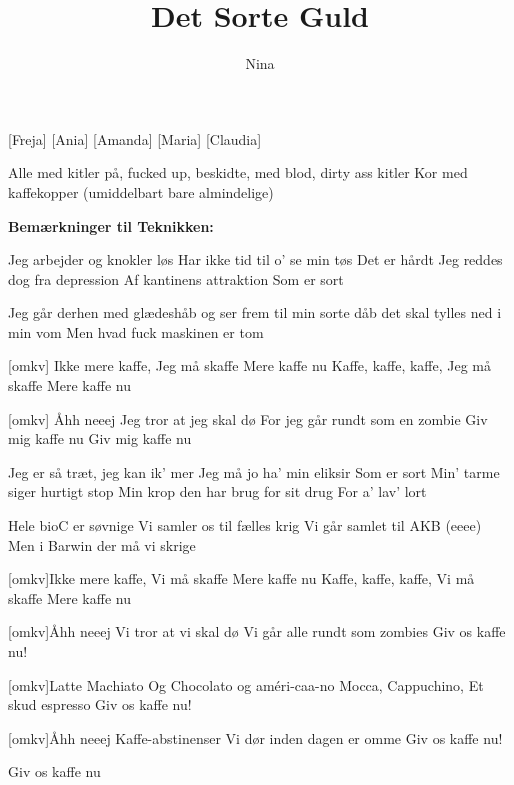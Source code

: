 \documentclass[a4paper,11pt]{article}
\title{Det Sorte Guld}
\author{Nina}
\begin{document}
\maketitle

\begin{roles}
    [Freja]
[Ania]
[Amanda]
[Maria]
[Claudia]
\end{roles}

\begin{props}
     Alle med kitler på, fucked up, beskidte, med blod, dirty ass kitler
    Kor med kaffekopper (umiddelbart bare almindelige)
\end{props}

\textbf{Bemærkninger til Teknikken:} %


\begin{song}
   Jeg arbejder og knokler løs
Har ikke tid til o’ se min tøs
Det er hårdt
Jeg reddes dog fra depression
Af kantinens attraktion
Som er sort
 
Jeg går derhen med glædeshåb
og ser frem til min sorte dåb
det skal tylles ned i min vom
Men hvad fuck maskinen er tom

  [omkv] Ikke mere kaffe, 
Jeg må skaffe 
Mere kaffe nu
Kaffe, kaffe, kaffe, 
Jeg må skaffe 
Mere kaffe nu
 
 [omkv] Åhh neeej
Jeg tror at jeg skal dø
For jeg går rundt som en zombie
Giv mig kaffe nu 
Giv mig kaffe nu

 Jeg er så træt, jeg kan ik’ mer
Jeg må jo ha’ min eliksir
Som er sort
Min’ tarme siger hurtigt stop
Min krop den har brug for sit drug
For a’ lav’ lort
 
Hele bioC er søvnige
Vi samler os til fælles krig
Vi går samlet til AKB (eeee)
Men i Barwin der må vi skrige

 [omkv]Ikke mere kaffe, 
Vi må skaffe 
Mere kaffe nu
Kaffe, kaffe, kaffe, 
Vi må skaffe 
Mere kaffe nu
 
 [omkv]Åhh neeej
Vi tror at vi skal dø
Vi går alle rundt som zombies
Giv os kaffe nu! 
 
 [omkv]Latte Machiato 
Og Chocolato 
og améri-caa-no
Mocca, Cappuchino,
Et skud espresso 
Giv os kaffe nu!
 
 [omkv]Åhh neeej
Kaffe-abstinenser
Vi dør inden dagen er omme
Giv os kaffe nu!
 
Giv os kaffe nu 

\end{song}
\end{document}
